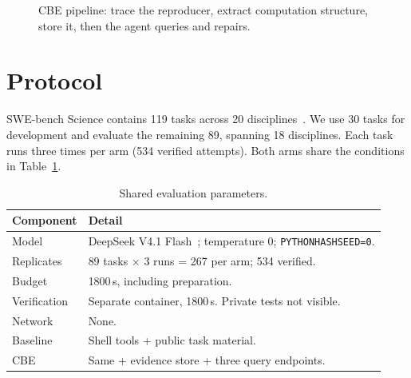 \documentclass[11pt,a4paper,twocolumn]{article}
\newcommand{\smalltable}{\fontsize{8.7}{10.7}\selectfont\setlength{\tabcolsep}{3pt}\renewcommand{\arraystretch}{1.12}}
\begin{document}
\begin{figure}[t]
\centering
{}
\caption{CBE pipeline: trace the reproducer, extract computation structure, store it, then the agent queries and repairs.}
\label{fig:method}
\end{figure}

\section{Protocol}
\label{sec:protocol}

SWE-bench Science contains 119 tasks across 20 disciplines~\citep{xu2026science}. We use 30 tasks for development and evaluate the remaining 89, spanning 18 disciplines. Each task runs three times per arm (534 verified attempts). Both arms share the conditions in Table~\ref{tab:setup}.

\begin{table}[t]
\caption{Shared evaluation parameters.}
\label{tab:setup}
\smalltable
\begin{tabularx}{\columnwidth}{@{}p{1.65cm}X@{}}
\toprule
Component & Detail \\
\midrule
Model & DeepSeek V4.1 Flash~\citep{deepseek2026}; temperature 0; \texttt{PYTHONHASHSEED=0}. \\
Replicates & 89 tasks $\times$ 3 runs = 267 per arm; 534 verified. \\
Budget & 1800\,s, including preparation. \\
Verification & Separate container, 1800\,s. Private tests not visible. \\
Network & None. \\
Baseline & Shell tools + public task material. \\
CBE & Same + evidence store + three query endpoints. \\
\bottomrule
\end{tabularx}
\end{table}
\end{document}
